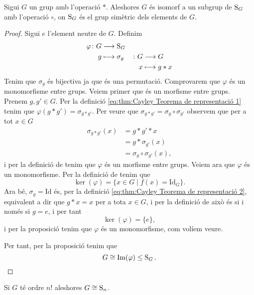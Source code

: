 \documentclass[../Apunts.tex]{subfiles}
\begin{document}
	\begin{theorem}
		\label{thm:Cayley Teorema de representació}
		Sigui \(G\) un grup amb l'operació \(\ast\). Aleshores \(G\) és isomorf a un subgrup de \(\operatorname{S}_{G}\) amb l'operació \(\circ\), on \(\operatorname{S}_{G}\) és el grup simètric dels elements de \(G\). %
		\begin{proof}
			Sigui \(e\) l'element neutre de \(G\). Definim
			\begin{alignat}{2}
			\varphi\colon G&\longrightarrow\operatorname{S}_{G}&&\label{eq:thm:Cayley Teorema de representació 1}\\
			g&\longmapsto\sigma_{g}&\colon G&\longrightarrow G\label{eq:thm:Cayley Teorema de representació 2}\\
			&&x&\longmapsto g\ast x\nonumber
			\end{alignat}
			Tenim que \(\sigma_{g}\) és bijectiva ja que és una permutació. %
			Comprovarem que \(\varphi\) és un monomorfisme entre grups. Veiem primer que és un morfisme entre grups. Prenem \(g,g'\in G\). Per la definició \eqref{eq:thm:Cayley Teorema de representació 1} tenim que \(\varphi(g\ast g')=\sigma_{g\ast g'}\). Per veure que \(\sigma_{g\ast g'}=\sigma_{g}\circ\sigma_{g'}\) observem que per a tot \(x\in G\)
			\begin{align*}
			\sigma_{g\ast g'}(x)&=g\ast g'\ast x\\
			&=g\ast\sigma_{g'}(x)\\
			&=\sigma_{g}\circ\sigma_{g'}(x),
			\end{align*}
			i per la definició de  tenim que \(\varphi\) és un morfisme entre grups. Veiem ara que \(\varphi\) és un monomorfisme. Per la definició de  tenim que
			\[\ker(\varphi)=\{x\in G\mid f(x)=\text{Id}_{G}\}.\]
			Ara bé, \(\sigma_{g}=\text{Id}\) és, per la definició \eqref{eq:thm:Cayley Teorema de representació 2}, equivalent a dir que \(g\ast x=x\) per a tota \(x\in G\), i per la definició de  això és si i només si \(g=e\), i per tant
			\[\ker(\varphi)=\{e\},\]
			i per la proposició  tenim que \(\varphi\) és un monomorfisme, com volíem veure.
			
			Per tant, per la proposició  tenim que
			\[G\cong \operatorname{Im}(\varphi)\leq\operatorname{S}_{G}.\qedhere\]
		\end{proof}
	\end{theorem}
	\begin{corollary}
		Si \(G\) té ordre \(n!\) aleshores \(G\cong\operatorname{S}_{n}\).
	\end{corollary}
\end{document}
